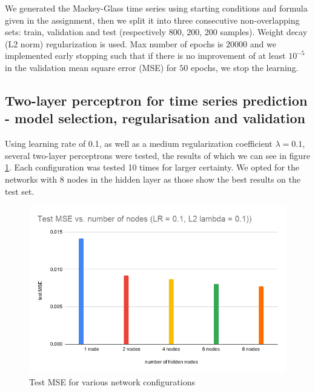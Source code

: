 \documentclass[a4paper]{article}
\begin{document}
We generated the Mackey-Glass time series using starting conditions and formula given in the assignment, then we split it into three consecutive non-overlapping sets: train, validation and test (respectively 800, 200, 200 samples). Weight decay (L2 norm) regularization is used. Max number of epochs is $20000$ and we implemented early stopping such that if there is no improvement of at least $10^{-5}$ in the validation mean square error (MSE) for $50$ epochs, we stop the learning.


\subsection{Two-layer perceptron for time series prediction - model selection, regularisation and validation}
Using learning rate of 0.1, as well as a medium regularization coefficient $\lambda = 0.1$, several two-layer perceptrons were tested, the results of which we can see in figure \ref{fig:learning_outcomes}. Each configuration was tested 10 times for larger certainty. We opted for the networks with 8 nodes in the hidden layer as those show the best results on the test set.

\begin{figure}[ht]
    \centering
    \includegraphics[width=.55\linewidth]{img/4_1_mse_bar.png}
	\caption{Test MSE for various network configurations}
	\label{fig:learning_outcomes}
\end{figure}
\end{document}
